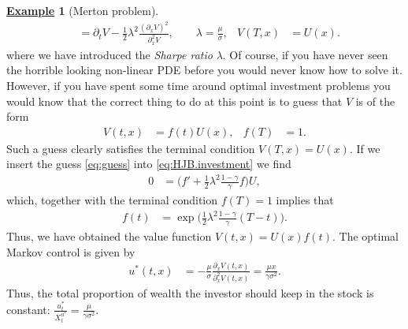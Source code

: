 \documentclass[12pt]{book}
\numberwithin{equation}{chapter}
\theoremstyle{plain}
\numberwithin{theorem}{section}
\theoremstyle{definition}
\newtheorem{example}[theorem]{\underline{Example}}
\numberwithin{exercise}{chapter}
\newcommand{\<}{\langle}
\renewcommand{\>}{\rangle}
\renewcommand{\(}{\left(}
\renewcommand{\)}{\right)}
\renewcommand{\[}{\left[}
\renewcommand{\]}{\right]}
\newcommand\sig{\sigma}
\newcommand\gam{\gamma}
\newcommand\lam{\lambda}
\renewcommand\d{\partial}
\begin{document}
\begin{example}[Merton problem]
\begin{align}
	&=	\d_t V - \frac{1}{2} \lam^2 \frac{(\d_x V)^2}{\d_x^2 V}, \qquad
\lam
	=	\frac{\mu}{\sig} , &
V(T,x)
	&=	U(x) . \label{eq:HJB.investment}
\end{align}
where we have introduced the \emph{Sharpe ratio} $\lam$.  Of course, if you have never seen the horrible looking non-linear PDE before you would never know how to solve it.  However, if you have spent some time around optimal investment problems you would know that the correct thing to do at this point is to guess that $V$ is of the form
\begin{align}
V(t,x)
	&=	f(t) U(x) , &
f(T)
	&=	1 . \label{eq:guess}
\end{align}
Such a guess clearly satisfies the terminal condition $V(T,x) = U(x)$.  If we insert the guess \eqref{eq:guess} into \eqref{eq:HJB.investment} we find
\begin{align}
0
	&=	\Big( f' + \tfrac{1}{2} \lam^2 \tfrac{1-\gam}{\gam} f \Big) U ,
\end{align}
which, together with the terminal condition $f(T) = 1$ implies that
\begin{align}
f(t)
	&=	\exp \Big( \tfrac{1}{2} \lam^2 \tfrac{1-\gam}{\gam}(T-t) \Big) .
\end{align}
Thus, we have obtained the value function $V(t,x) = U(x) f(t)$.  The optimal Markov control is given by
\begin{align}
u^*(t,x)
	&=	- \frac{\mu}{\sig} \frac{\d_x V(t,x)}{\d_x^2 V(t,x)}
	=		\frac{ \mu x }{\gam \sig^2} .
\end{align}
Thus, the total proportion of wealth the investor should keep in the stock is constant: $\frac{u_t^*}{X_t^{u^*}} = \frac{\mu}{\gam \sig^2}$.
\end{example}
\end{document}
